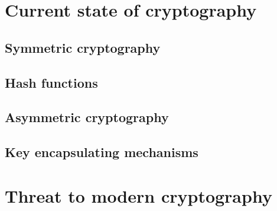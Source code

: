 \chapter{Current state of cryptography}
\label{chapt:1}


\section{Symmetric cryptography}
\label{sec:1_1}


\section{Hash functions}
\label{sec:1_2}


\section{Asymmetric cryptography}
\label{sec:1_3}


\section{Key encapsulating mechanisms}
\label{sec:1_4}


\chapter{Threat to modern cryptography}
\label{chapt:2}






